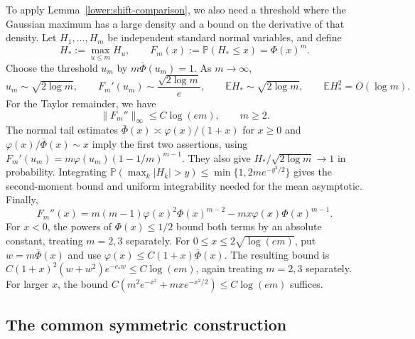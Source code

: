 \documentclass[11pt,letterpaper]{article}
\theoremstyle{remark}
\newcommand{\E}{\mathbb E}
\newcommand{\Pp}{\mathbb P}
\begin{document}
To apply Lemma~\ref{lower:shift-comparison}, we also need a threshold
where the Gaussian maximum has a large density and a bound on the
derivative of that density. Let \(H_1,\ldots,H_m\) be independent
standard normal variables, and define
\[
 H_*:=\max_{u\le m}H_u,\qquad F_m(x):=\Pp(H_*\le x)=\Phi(x)^m.
\]
Choose the threshold \(u_m\) by \(m\bar\Phi(u_m)=1\).
As \(m\to\infty\),
\begin{equation}
 u_m\sim\sqrt{2\log m},\qquad
 F_m'(u_m)\sim\frac{\sqrt{2\log m}}e,\qquad
 \E H_*\sim\sqrt{2\log m},\qquad \E H_*^2=O(\log m).
 \label{sym:eq:gaussian-max}
\end{equation}
For the Taylor remainder, we have
\begin{equation}
 \|F_m''\|_\infty\le C\log(em),\qquad m\ge2.
 \label{sym:eq:gaussian-smoothness}
\end{equation}
The normal tail estimates
\(\bar\Phi(x)\asymp\varphi(x)/(1+x)\) for \(x\ge0\) and
\(\varphi(x)/\bar\Phi(x)\sim x\) imply the first two assertions,
using \(F_m'(u_m)=m\varphi(u_m)(1-1/m)^{m-1}\).
They also give \(H_*/\sqrt{2\log m}\to1\) in probability.
Integrating \(\Pp(\max_k|H_k|>y)\le\min\{1,2me^{-y^2/2}\}\)
gives the second-moment bound and uniform integrability needed for
the mean asymptotic. Finally,
\[
 F_m''(x)=m(m-1)\varphi(x)^2\Phi(x)^{m-2}
             -mx\varphi(x)\Phi(x)^{m-1}.
\]
For \(x<0\), the powers of \(\Phi(x)\le1/2\) bound both terms
by an absolute constant, treating \(m=2,3\) separately. For
\(0\le x\le2\sqrt{\log(em)}\), put \(w=m\bar\Phi(x)\) and use
\(\varphi(x)\le C(1+x)\bar\Phi(x)\). The resulting bound is
\(C(1+x)^2(w+w^2)e^{-c_*w}\le C\log(em)\), again treating
\(m=2,3\) separately. For larger \(x\), the bound
\(C(m^2e^{-x^2}+mx e^{-x^2/2})\le C\log(em)\) suffices.

\subsection{The common symmetric construction}
\label{app:lower-family}
\end{document}
